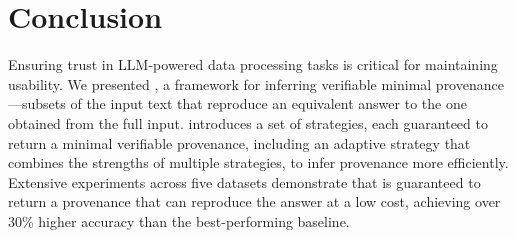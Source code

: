 \vspace{-1mm}
\section{Conclusion}
\label{sec:conclusion}
Ensuring trust in LLM-powered data processing tasks is critical for maintaining usability. We presented \sys, a framework for inferring verifiable minimal provenance—subsets of the input text that reproduce an equivalent answer to the one obtained from the full input. \sys introduces a set of strategies, each guaranteed to return a minimal verifiable provenance, including an adaptive strategy that combines the strengths of multiple strategies, to infer provenance more efficiently.  Extensive experiments across five datasets demonstrate that \sys is guaranteed to return a provenance that can reproduce the answer at a low cost, achieving over 30\% higher accuracy than the best-performing baseline. 



 